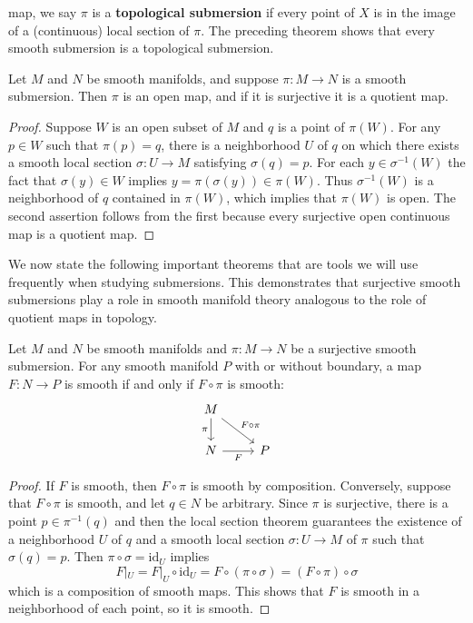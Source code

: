 map, we say $\pi$ is a \textbf{topological submersion} if every point of $X$ is in the image of a (continuous) local section of $\pi$. The preceding theorem shows that every smooth submersion is a topological submersion.
\begin{proposition}\label{smooth subm prop}
Let $M$ and $N$ be smooth manifolds, and suppose $\pi:M\to N$ is a smooth submersion. Then $\pi$ is an open map, and if it is surjective it is a quotient map.
\end{proposition}
\begin{proof}
Suppose $W$ is an open subset of $M$ and $q$ is a point of $\pi(W)$. For any $p\in W$
such that $\pi(p)=q$, there is a neighborhood $U$ of $q$ on which there exists a smooth local section $\sigma:U\to M$ satisfying $\sigma(q)=p$. For each $y\in\sigma^{-1}(W)$ the fact that $\sigma(y)\in W$ implies $y=\pi(\sigma(y))\in\pi(W)$. Thus $\sigma^{-1}(W)$ is a neighborhood of $q$ contained in $\pi(W)$, which implies that $\pi(W)$ is open. The second assertion follows from the first because every surjective open continuous map is a quotient map.
\end{proof}
We now state the following important theorems that are tools we will use frequently when studying submersions. This demonstrates that surjective smooth submersions play a role in smooth manifold theory analogous to the role of quotient maps in topology.
\begin{theorem}\label{manifold surjective submersion char}
Let $M$ and $N$ be smooth manifolds and $\pi:M\to N$ be a surjective smooth submersion. For any smooth manifold $P$ with or without boundary, a map $F:N\to P$ is smooth if and only if $F\circ\pi$ is smooth:
\[\begin{tikzcd}
M\ar[d,swap,"\pi"]\ar[rd,"F\circ\pi"]&\\
N\ar[r,swap,"F"]&P
\end{tikzcd}\]
\end{theorem}
\begin{proof}
If $F$ is smooth, then $F\circ\pi$ is smooth by composition. Conversely, suppose that $F\circ\pi$ is smooth, and let $q\in N$ be arbitrary. Since $\pi$ is surjective, there is a point $p\in\pi^{-1}(q)$ and then the local section theorem guarantees the existence of a neighborhood $U$ of $q$ and a smooth local section $\sigma:U\to M$ of $\pi$ such that $\sigma(q)=p$. Then $\pi\circ\sigma=\mathrm{id}_U$ implies
\[F|_U=F|_U\circ\mathrm{id}_U=F\circ(\pi\circ\sigma)=(F\circ\pi)\circ\sigma\]
which is a composition of smooth maps. This shows that $F$ is smooth in a neighborhood of each point, so it is smooth.
\end{proof}

